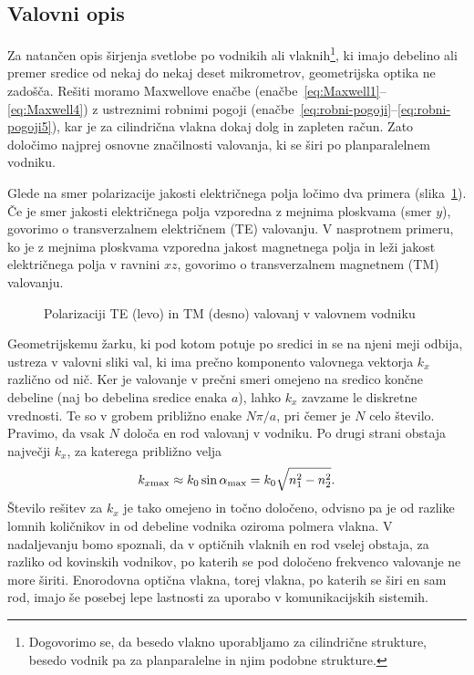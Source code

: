 \subsection*{Valovni opis}
Za natančen opis širjenja svetlobe po vodnikih ali vlaknih\footnote{Dogovorimo se, da  
besedo vlakno uporabljamo za cilindrične strukture, besedo vodnik pa za planparalelne 
in njim podobne strukture.}, ki imajo debelino ali premer
sredice od nekaj do nekaj deset mikrometrov, geometrijska optika ne
zadošča. Rešiti moramo Maxwellove enačbe (enačbe~\ref{eq:Maxwell1}--\ref{eq:Maxwell4}) 
z ustreznimi robnimi pogoji (enačbe~\ref{eq:robni-pogoji}--\ref{eq:robni-pogoji5}),
kar je za cilindrična vlakna dokaj dolg in zapleten račun. Zato določimo najprej 
osnovne značilnosti valovanja, ki se širi po planparalelnem vodniku.

Glede na smer polarizacije jakosti električnega polja
ločimo dva primera (slika~\ref{fig:TETM}). Če je smer jakosti električnega polja
vzporedna z mejnima ploskvama (smer $y$), 
govorimo o transverzalnem električnem (TE) valovanju. 
V nasprotnem primeru, ko je 
z mejnima ploskvama vzporedna jakost magnetnega polja in 
leži jakost električnega polja v ravnini $xz$, 
govorimo o transverzalnem magnetnem (TM) valovanju.
\begin{figure}[h]
\centering
\def\svgwidth{140truemm} 

\caption{Polarizaciji TE (levo) in TM (desno) valovanj v valovnem vodniku}
\label{fig:TETM}
\end{figure}

Geometrijskemu žarku, ki pod kotom potuje po sredici in se na njeni meji
odbija, ustreza v valovni sliki val, ki ima prečno komponento valovnega
vektorja $k_{x}$ različno od nič. Ker je valovanje v prečni smeri 
omejeno na sredico končne debeline (naj bo debelina sredice enaka $a$), lahko
$k_{x}$ zavzame le diskretne vrednosti. Te so v grobem približno enake $N\pi/a$, pri čemer je $N$
celo število. Pravimo, da vsak $N$ določa en rod valovanj v vodniku. Po drugi strani 
obstaja največji $k_x$, za katerega približno velja
\begin{equation}
k_{x \mathrm{max}} \approx k_0 \sin\alpha_{\rm max} = k_0 \sqrt{n_1^2 -n_2^2}.
\end{equation}
Število rešitev za $k_x$ je tako omejeno in točno določeno, odvisno
pa je od razlike lomnih količnikov in od debeline vodnika oziroma polmera vlakna. 
V nadaljevanju bomo spoznali, da v optičnih vlaknih en rod vselej obstaja,
za razliko od kovinskih vodnikov, po katerih se pod določeno frekvenco
valovanje ne more širiti. Enorodovna optična vlakna, torej vlakna, po katerih se širi
en sam rod, imajo še posebej lepe lastnosti za uporabo v komunikacijskih
sistemih.


